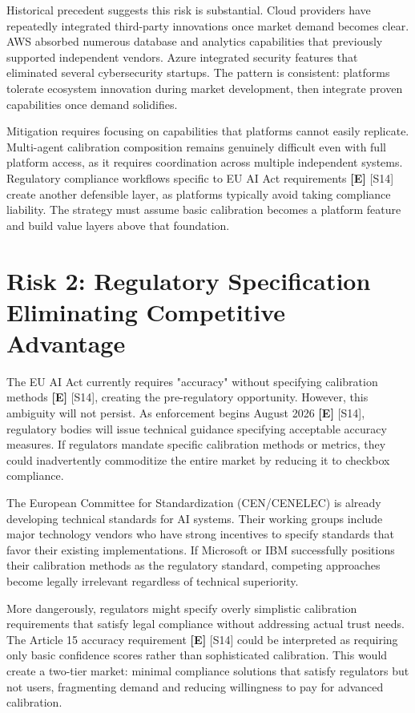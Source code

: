 \documentclass[a4paper,11pt]{article}
\newcommand{\elabel}{\textbf{\textcolor{ecolor}{[E]}}}
\begin{document}
Historical precedent suggests this risk is substantial. Cloud providers have repeatedly integrated third-party innovations once market demand becomes clear. AWS absorbed numerous database and analytics capabilities that previously supported independent vendors. Azure integrated security features that eliminated several cybersecurity startups. The pattern is consistent: platforms tolerate ecosystem innovation during market development, then integrate proven capabilities once demand solidifies.


Mitigation requires focusing on capabilities that platforms cannot easily replicate. Multi-agent calibration composition remains genuinely difficult even with full platform access, as it requires coordination across multiple independent systems. Regulatory compliance workflows specific to EU AI Act requirements \elabel{} \textcolor{primary}{[S14]} create another defensible layer, as platforms typically avoid taking compliance liability. The strategy must assume basic calibration becomes a platform feature and build value layers above that foundation.


\section{Risk 2: Regulatory Specification Eliminating Competitive Advantage}

The EU AI Act currently requires "accuracy" without specifying calibration methods \elabel{} \textcolor{primary}{[S14]}, creating the pre-regulatory opportunity. However, this ambiguity will not persist. As enforcement begins August 2026 \elabel{} \textcolor{primary}{[S14]}, regulatory bodies will issue technical guidance specifying acceptable accuracy measures. If regulators mandate specific calibration methods or metrics, they could inadvertently commoditize the entire market by reducing it to checkbox compliance.


The European Committee for Standardization (CEN/CENELEC) is already developing technical standards for AI systems. Their working groups include major technology vendors who have strong incentives to specify standards that favor their existing implementations. If Microsoft or IBM successfully positions their calibration methods as the regulatory standard, competing approaches become legally irrelevant regardless of technical superiority.


More dangerously, regulators might specify overly simplistic calibration requirements that satisfy legal compliance without addressing actual trust needs. The Article 15 accuracy requirement \elabel{} \textcolor{primary}{[S14]} could be interpreted as requiring only basic confidence scores rather than sophisticated calibration. This would create a two-tier market: minimal compliance solutions that satisfy regulators but not users, fragmenting demand and reducing willingness to pay for advanced calibration.
\end{document}

